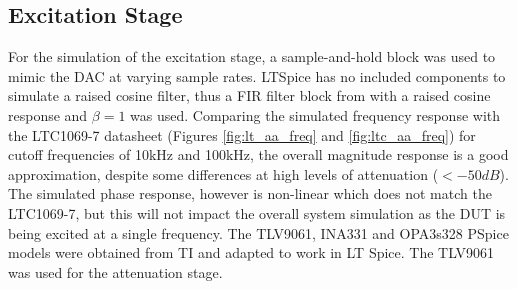 \subsection{Excitation Stage}
For the simulation of the excitation stage, a sample-and-hold block was used to mimic the DAC at varying sample rates. LTSpice has no included components to simulate a raised cosine filter, thus a FIR filter block from \cite{FilterManual} with a raised cosine response and $\beta = 1$ was used. Comparing the simulated frequency response with the LTC1069-7 datasheet (Figures \ref{fig:lt_aa_freq} and \ref{fig:ltc_aa_freq}) for cutoff frequencies of 10kHz and 100kHz, the overall magnitude response is a good approximation, despite some differences at high levels of attenuation ($<-50dB$). The simulated phase response, however is non-linear which does not match the LTC1069-7, but this will not impact the overall system simulation as the DUT is being excited at a single frequency. The TLV9061, INA331 and OPA3s328 PSpice models were obtained from TI and adapted to work in LT Spice. The TLV9061 was used for the attenuation stage.

